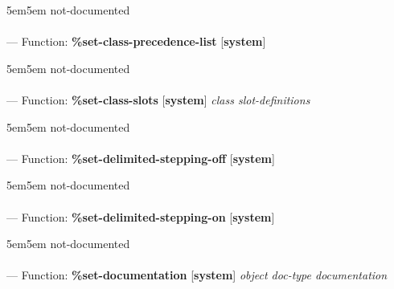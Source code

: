 \begin{adjustwidth}{5em}{5em}
not-documented
\end{adjustwidth}

\paragraph{}
\label{SYSTEM:SET-CLASS-PRECEDENCE-LIST}
--- Function: \textbf{\%set-class-precedence-list} [\textbf{system}] \textit{}

\begin{adjustwidth}{5em}{5em}
not-documented
\end{adjustwidth}

\paragraph{}
\label{SYSTEM:SET-CLASS-SLOTS}
--- Function: \textbf{\%set-class-slots} [\textbf{system}] \textit{class slot-definitions}

\begin{adjustwidth}{5em}{5em}
not-documented
\end{adjustwidth}

\paragraph{}
\label{SYSTEM:SET-DELIMITED-STEPPING-OFF}
--- Function: \textbf{\%set-delimited-stepping-off} [\textbf{system}] \textit{}

\begin{adjustwidth}{5em}{5em}
not-documented
\end{adjustwidth}

\paragraph{}
\label{SYSTEM:SET-DELIMITED-STEPPING-ON}
--- Function: \textbf{\%set-delimited-stepping-on} [\textbf{system}] \textit{}

\begin{adjustwidth}{5em}{5em}
not-documented
\end{adjustwidth}

\paragraph{}
\label{SYSTEM:SET-DOCUMENTATION}
--- Function: \textbf{\%set-documentation} [\textbf{system}] \textit{object doc-type documentation}

